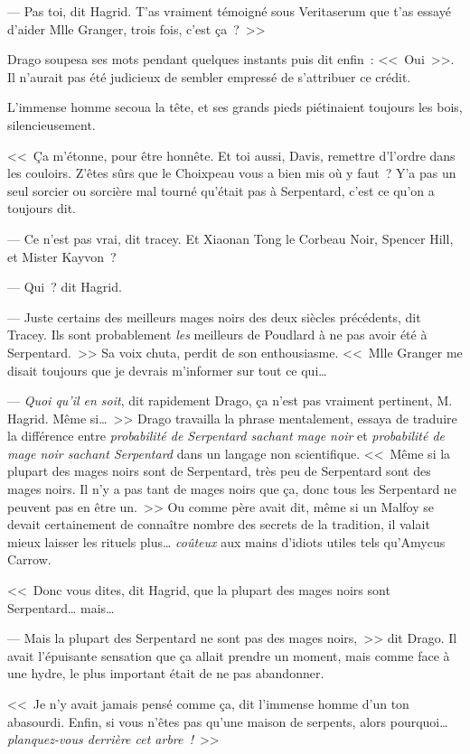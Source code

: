 --- Pas toi, dit Hagrid. T'as vraiment témoigné sous Veritaserum que t'as essayé d'aider Mlle Granger, trois fois, c'est ça~?~>>

Drago soupesa ses mots pendant quelques instants puis dit enfin~: <<~Oui~>>. Il n'aurait pas été judicieux de sembler empressé de s'attribuer ce crédit.

L'immense homme secoua la tête, et ses grands pieds piétinaient toujours les bois, silencieusement.

<<~Ça m'étonne, pour être honnête. Et toi aussi, Davis, remettre d'l'ordre dans les couloirs. Z'êtes sûrs que le Choixpeau vous a bien mis où y faut~? Y'a pas un seul sorcier ou sorcière mal tourné qu'était pas à Serpentard, c'est ce qu'on a toujours dit.

--- Ce n'est pas vrai, dit tracey. Et Xiaonan Tong le Corbeau Noir, Spencer Hill, et Mister Kayvon~?

--- Qui~? dit Hagrid.

--- Juste certains des meilleurs mages noirs des deux siècles précédents, dit Tracey. Ils sont probablement \emph{les} meilleurs de Poudlard à ne pas avoir été à Serpentard.~>> Sa voix chuta, perdit de son enthousiasme. <<~Mlle Granger me disait toujours que je devrais m'informer sur tout ce qui…

--- \emph{Quoi qu'il en soit}, dit rapidement Drago, ça n'est pas vraiment pertinent, M. Hagrid. Même si…~>> Drago travailla la phrase mentalement, essaya de traduire la différence entre \emph{probabilité de Serpentard sachant mage noir} et \emph{probabilité de mage noir sachant Serpentard} dans un langage non scientifique. <<~Même si la plupart des mages noirs sont de Serpentard, très peu de Serpentard sont des mages noirs. Il n'y a pas tant de mages noirs que ça, donc tous les Serpentard ne peuvent pas en être un.~>> Ou comme père avait dit, même si un Malfoy se devait certainement de connaître nombre des secrets de la tradition, il valait mieux laisser les rituels plus… \emph{coûteux} aux mains d'idiots utiles tels qu'Amycus Carrow.

<<~Donc vous dites, dit Hagrid, que la plupart des mages noirs sont Serpentard… mais…

--- Mais la plupart des Serpentard ne sont pas des mages noirs,~>> dit Drago. Il avait l'épuisante sensation que ça allait prendre un moment, mais comme face à une hydre, le plus important était de ne pas abandonner.

<<~Je n'y avait jamais pensé comme ça, dit l'immense homme d'un ton abasourdi. Enfin, si vous n'êtes pas qu'une maison de serpents, alors pourquoi… \emph{planquez-vous derrière cet arbre~!}~>>

